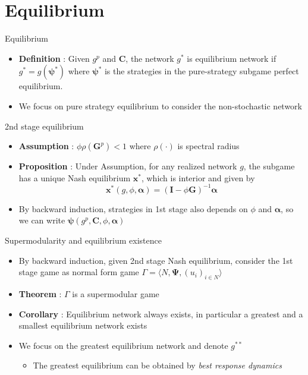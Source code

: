 \documentclass[10pt,dvipdfmx]{beamer}
\begin{document}
\section{Equilibrium}

\begin{frame}{Equilibrium}
\begin{itemize}
    \item {\bf{Definition}} : Given $g^p$ and $\bm{C}$, the network $g^*$ is equilibrium network if $g^* = g(\bm{\psi}^*)$ where $\bm{\psi}^*$ is the strategies in the pure-strategy subgame perfect equilibrium.
    \item We focus on pure strategy equilibrium to consider the non-stochastic network
\end{itemize}
\end{frame}

\begin{frame}{2nd stage equilibrium}
\begin{itemize}
    \item {\bf{Assumption}} : $\phi \rho(\bm{G}^p) < 1$ where $\rho(\cdot)$ is spectral radius
    \item {\bf{Proposition}} : Under Assumption, for any realized network $g$, the subgame has a unique Nash equilibrium $\bm{x}^*$, which is interior and given by
    \[ \bm{x}^*(g, \phi, \bm{\alpha}) = {(\bm{I} - \phi \bm{G})}^{-1} \bm{\alpha} \]
    \item By backward induction, strategies in 1st stage also depends on $\phi$ and $\bm{\alpha}$, so we can write $\bm{\psi}(g^p, \bm{C}, \phi, \bm{\alpha})$
\end{itemize}
\end{frame}

\begin{frame}{Supermodularity and equilibrium existence}
\begin{itemize}
    \item By backward induction, given 2nd stage Nash equilibrium, consider the 1st stage game as normal form game $\Gamma = \langle N, \bm{\Psi}, {(u_i)}_{i \in N} \rangle$
    \item {\bf{Theorem}} : $\Gamma$ is a supermodular game
    \item {\bf{Corollary}} : Equilibrium network always exists, in particular a greatest and a smallest equilibrium network exists
    \item We focus on the greatest equilibrium network and denote $g^{**}$
    \begin{itemize}
        \item The greatest equilibrium can be obtained by {\it{best response dynamics}}
    \end{itemize}
\end{itemize}
\end{frame}
\end{document}
